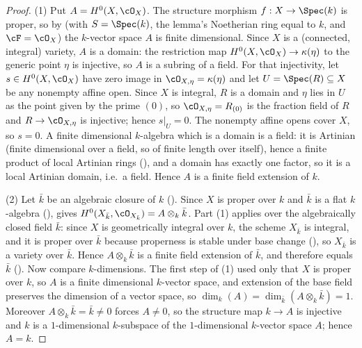 \begin{proof}
(1) Put $A=H^0(X,\cO_X)$.  The structure morphism $f:X\to\Spec(k)$ is
proper, so by  (with $S=\Spec(k)$, the
lemma's Noetherian ring equal to $k$, and $\cF=\cO_X$) the $k$-vector
space $A$ is finite dimensional.  Since $X$ is a (connected, integral)
variety, $A$ is a domain: the restriction
map $H^0(X,\cO_X)\to\kappa(\eta)$ to the generic point $\eta$ is
injective, so $A$ is a subring of a field.  For that injectivity, let
$s\in H^0(X,\cO_X)$ have zero image in $\cO_{X,\eta}=\kappa(\eta)$ and
let $U=\Spec(R)\subseteq X$ be any nonempty affine open.  Since $X$ is
integral, $R$ is a domain and $\eta$ lies in $U$ as the point given by
the prime $(0)$, so $\cO_{X,\eta}=R_{(0)}$ is the fraction field of
$R$ and $R\to\cO_{X,\eta}$ is injective; hence $s|_U=0$.  The nonempty
affine opens cover $X$, so $s=0$.
A finite dimensional $k$-algebra which is a domain is a field: it is
Artinian (finite dimensional over a field, so of finite length over
itself), hence a finite product of local Artinian rings
(), and a domain has exactly one
factor, so it is a local Artinian domain, i.e.\ a field.  Hence $A$ is a finite field extension
of $k$.

(2) Let $\bar k$ be an algebraic closure of $k$
().  Since $X$ is proper over $k$ and
$\bar k$ is a flat $k$-algebra (),
 gives
$H^0(X_{\bar k},\cO_{X_{\bar k}})=A\otimes_k\bar k$.  Part (1) applies
over the algebraically closed field $\bar k$: since $X$ is
geometrically integral over $k$, the scheme $X_{\bar k}$ is integral,
and it is proper over $\bar k$ because properness is stable under base
change (), so $X_{\bar k}$ is a variety
over $\bar k$.  Hence
$A\otimes_k\bar k$ is a finite field extension of $\bar k$, and
therefore equals $\bar k$
().  Now compare
$k$-dimensions.  The first step of (1) used only that $X$ is
proper over $k$, so $A$ is a finite dimensional $k$-vector space, and
extension of the base field preserves the dimension of a vector space,
so $\dim_k(A)=\dim_{\bar k}(A\otimes_k\bar k)=1$.  Moreover
$A\otimes_k\bar k=\bar k\neq 0$ forces $A\neq 0$, so the structure map
$k\to A$ is injective and $k$ is a $1$-dimensional $k$-subspace of the
$1$-dimensional $k$-vector space $A$; hence $A=k$.
\end{proof}

